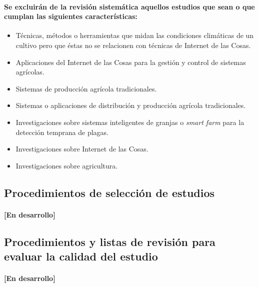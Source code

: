 \documentclass[10pt, twocolumn]{article}
\begin{document}
\paragraph{Se excluirán de la revisión sistemática aquellos estudios que sean o que cumplan las siguientes características:}
\begin{itemize}
	\item{Técnicas, métodos o herramientas que midan las condiciones climáticas de un cultivo pero que éstas no se relacionen con técnicas de Internet de las Cosas.}
	\item{Aplicaciones del Internet de las Cosas para la gestión y control de sistemas agrícolas.}
	\item{Sistemas de producción agrícola tradicionales.}
	\item{Sistemas o aplicaciones de distribución y producción agrícola tradicionales.}
	\item{Investigaciones sobre sistemas inteligentes de granjas o \textit{smart farm} para la detección temprana de plagas.}
	\item{Investigaciones sobre Internet de las Cosas.}
	\item{Investigaciones sobre agricultura.}
\end{itemize}

\subsection{Procedimientos de selección de estudios}
\paragraph{[En desarrollo]}

\subsection{Procedimientos y listas de revisión para evaluar la calidad del estudio}
\paragraph{[En desarrollo]}
\end{document}
